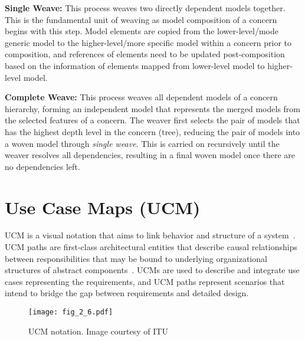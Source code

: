 \textbf{Single Weave:} This process weaves two directly dependent models together. This is the fundamental unit of weaving as model composition of a concern begins with this step. Model elements are copied from the lower-level/mode generic model to the higher-level/more specific model within a concern prior to composition, and references of elements need to be updated post-composition based on the information of elements mapped from lower-level model to higher-level model.

\textbf{Complete Weave:} This process weaves all dependent models of a concern hierarchy, forming an independent model that represents the merged models from the selected features of a concern. The weaver first selects the pair of models that has the highest depth level in the concern (tree), reducing the pair of models into a woven model through \emph{single weave}. This is carried on recursively until the weaver resolves all dependencies, resulting in a final woven model once there are no dependencies left.

\section{Use Case Maps (UCM)} \label{sec:2.2}

UCM is a visual notation that aims to link behavior and structure of a system~\cite{amyot2003introduction, buhr1995use}. UCM paths are first-class architectural entities that describe causal relationships between responsibilities that may be bound to underlying organizational structures of abstract components~\cite{buhr1998use}. UCMs are used to describe and integrate use cases representing the requirements, and UCM paths represent scenarios that intend to bridge the gap between requirements and detailed design.

\begin{figure}
	\centering
	\texttt{[image: fig\_2\_6.pdf]}
	\caption[UCM notation]{UCM notation. Image courtesy of ITU~\cite{itu2012151}}
	\label{fig:2.6}
\end{figure}

